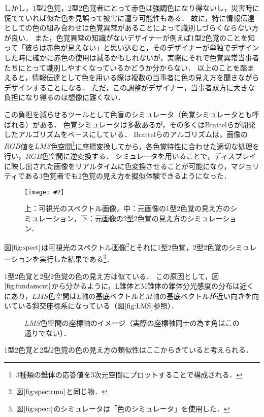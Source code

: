 \documentclass[uplatex,paper=a4,fontsize=4.0truemm,jafontsize=4.0truemm,head_space=30.0truemm,foot_space=30.0truemm,baselineskip=8.0truemm,line_length=40zw,gutter=25.0truemm,oneside,openany,fleqn,hanging_panctuation,open_bracket_pos=nibu_tentsuki,dvipdfmx,jis2004,book,titlepage]{jlreq}
\theoremstyle{mystyle}
\newcommand{\captiondot}[1]{\caption{#1．}}
\newcommand{\figureinput}[4]{\begin{figure}[tbp]\centering\texttt{[image: \#2]}\captiondot{#3}\label{fig:#4}\end{figure}}
\newcommand{\mathdisplaystyle}[1]{\(\displaystyle{#1}\)}
\newcommand{\Reference}[1]{\mathdisplaystyle{\ref{#1}}}
\begin{document}
			しかし，1型2色覚，2型2色覚者にとって赤色は強調色になり得ないし，災害時に慌てていれば似た色を見誤って被害に遭う可能性もある．
			故に，特に情報伝達としての色の組み合わせは色覚異常があることによって識別しづらくならない方が良い．
			また，色覚異常の知識がないデザイナーが例えば1型2色覚のことを知って「彼らは赤色が見えない」と思い込むと，そのデザイナーが単独でデザインした時に確かに赤色の使用は減るかもしれないが，実際にそれで色覚異常当事者たちにとって識別しやすくなっているかどうか分からない．
			以上のことを踏まえると，情報伝達として色を用いる際は複数の当事者に色の見え方を聞きながらデザインすることになる．
			ただ，この調整がデザイナー，当事者双方に大きな負担になり得るのは想像に難くない．

			この負担を減らせるツールとして色盲のシミュレータ（色覚シミュレータとも呼ばれる）がある．
			色覚シミュレータは多数あるが，その多くはBrattelらが開発したアルゴリズム\cite{Brettel1997}をベースにしている．
			Brattelらのアルゴリズムは，画像の\mathdisplaystyle{RGB}値を\mathdisplaystyle{LMS}色空間\footnote{3種類の錐体の応答値を3次元空間にプロットすることで構成される．}に座標変換してから，各色覚特性に合わせた適切な処理を行い，\mathdisplaystyle{RGB}色空間に逆変換する．
			シミュレータを用いることで，ディスプレイに映し出された画像をリアルタイムに色変換させることが可能になり，マジョリティである3色覚者でも2色覚の見え方を擬似体験できるようになった．
			\figureinput{width=10truecm}{D:/a/figs/S__53141507.jpg}{上：可視光のスペクトル画像，中：元画像の1型2色覚の見え方のシミュレーション，下：元画像の2型2色覚の見え方のシミュレーション}{spect}
			図\Reference{fig:spect}は可視光のスペクトル画像\footnote{図\protect\Reference{fig:spectrum}と同じ物．}とそれに1型2色覚，2型2色覚のシミュレーションを実行した結果である\footnote{図\protect\Reference{fig:spect}のシミュレータは「色のシミュレータ」を使用した．}．
			
			1型2色覚と2型2色覚の色の見え方は似ている．
			この原因として，図\Reference{fig:fundament}から分かるように，L錐体とM錐体の錐体分光感度の分布は近くにあり，\mathdisplaystyle{LMS}色空間は\mathdisplaystyle{L}軸の基底ベクトルと\mathdisplaystyle{M}軸の基底ベクトルが近い向きを向いている斜交座標系になっている（図\Reference{fig:LMS}参照）．
			\begin{figure}[tbp]
				\centering
				\captiondot{\protect\mathdisplaystyle{LMS}色空間の座標軸のイメージ（実際の座標軸同士の為す角はこの通りでない）}\label{fig:LMS}
			\end{figure}
			1型2色覚と2型2色覚の色の見え方の類似性はここからきていると考えられる．
\end{document}
